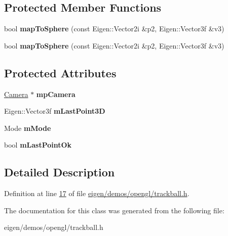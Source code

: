 \subsection*{Protected Member Functions}
\begin{DoxyCompactItemize}
\item 
\mbox{\label{class_trackball_a03355a08684ac21f9cff48454b240cab}} 
bool {\bfseries map\+To\+Sphere} (const Eigen\+::\+Vector2i \&p2, Eigen\+::\+Vector3f \&v3)
\item 
\mbox{\label{class_trackball_a03355a08684ac21f9cff48454b240cab}} 
bool {\bfseries map\+To\+Sphere} (const Eigen\+::\+Vector2i \&p2, Eigen\+::\+Vector3f \&v3)
\end{DoxyCompactItemize}
\subsection*{Protected Attributes}
\begin{DoxyCompactItemize}
\item 
\mbox{\label{class_trackball_acba84ff76a5bbbd0894f7e358235b142}} 
\hyperlink{class_camera}{Camera} $\ast$ {\bfseries mp\+Camera}
\item 
\mbox{\label{class_trackball_ae85b04c78444e5a480efd15559786ce3}} 
Eigen\+::\+Vector3f {\bfseries m\+Last\+Point3D}
\item 
\mbox{\label{class_trackball_a203e6a84014ae989e959e635ee03c4a7}} 
Mode {\bfseries m\+Mode}
\item 
\mbox{\label{class_trackball_a75b82d9feb2e0b3efa2bf98c55c78122}} 
bool {\bfseries m\+Last\+Point\+Ok}
\end{DoxyCompactItemize}


\subsection{Detailed Description}


Definition at line \hyperlink{eigen_2demos_2opengl_2trackball_8h_source_l00017}{17} of file \hyperlink{eigen_2demos_2opengl_2trackball_8h_source}{eigen/demos/opengl/trackball.\+h}.



The documentation for this class was generated from the following file\+:\begin{DoxyCompactItemize}
\item 
eigen/demos/opengl/trackball.\+h\end{DoxyCompactItemize}
